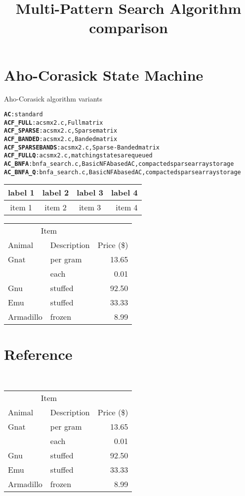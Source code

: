 \documentclass[a4paper]{article}
\begin{document}
\title{Multi-Pattern Search Algorithm comparison}
\author{}
\maketitle


\section{Aho-Corasick State Machine}
Aho-Corasick algorithm variants


\begin{alltt}
\textbf{AC}: standard
\textbf{ACF_FULL}: acsmx2.c, Full matrix
\textbf{ACF_SPARSE}: acsmx2.c, Sparse matrix
\textbf{ACF_BANDED}: acsmx2.c, Banded matrix
\textbf{ACF_SPARSEBANDS}: acsmx2.c, Sparse-Banded matrix
\textbf{ACF_FULLQ}: acsmx2.c, matching states are queued
\textbf{AC_BNFA}: bnfa_search.c, Basic NFA based AC, compacted sparse array storage
\textbf{AC_BNFA_Q}: bnfa_search.c, Basic NFA based AC, compacted sparse array storage
\end{alltt}

\begin{table}
\begin{tabular*}{0.75\textwidth}{ | c | c | c | r | }
  \hline
  label 1 & label 2 & label 3 & label 4 \\
  \hline
  item 1  & item 2  & item 3  & item 4  \\
  \hline
\end{tabular*}
\end{table}

\begin{tabular}{llr}
\hline
\multicolumn{2}{c}{Item} \\
\cline{1-2}
Animal    & Description & Price (\$) \\
\hline
Gnat      & per gram    & 13.65      \\
          & each        & 0.01       \\
Gnu       & stuffed     & 92.50      \\
Emu       & stuffed     & 33.33      \\
Armadillo & frozen      & 8.99       \\
\hline
\end{tabular}


\section{Reference}

\usepackage{booktabs}\\
  \begin{tabular}{llr}
    \toprule
    \multicolumn{2}{c}{Item} \\
    \cmidrule(r){1-2}
    Animal    & Description & Price (\$) \\
    \midrule
    Gnat      & per gram    & 13.65      \\
          &    each     & 0.01       \\
    Gnu       & stuffed     & 92.50      \\
    Emu       & stuffed     & 33.33      \\
    Armadillo & frozen      & 8.99       \\
    \bottomrule
  \end{tabular}
\end{document}

